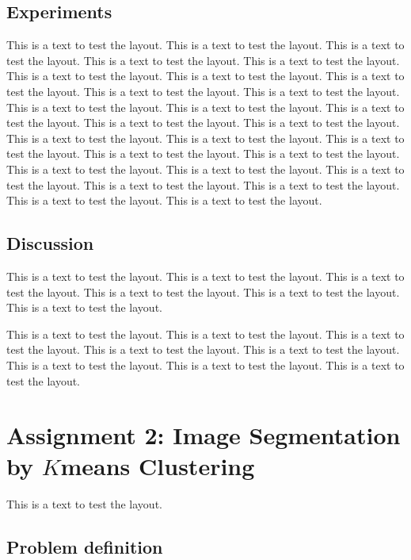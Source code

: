 \documentclass[a4paper,psfig,subfigure,epsfig,fleqn,ausarbeitung,amssmb,float,caption,fontenc]{article}
\begin{document}
\subsection{Experiments}

This is a text to test the layout. This is a text to test the layout.
This is a text to test the layout.  This is a text to test the layout.
This is a text to test the layout. This is a text to test the layout.
This is a text to test the layout. This is a text to test the layout.
This is a text to test the layout.  This is a text to test the layout.
This is a text to test the layout. This is a text to test the layout.
This is a text to test the layout. This is a text to test the layout.
This is a text to test the layout.  This is a text to test the layout.
This is a text to test the layout. This is a text to test the layout.
This is a text to test the layout. This is a text to test the layout.
This is a text to test the layout.  This is a text to test the layout.
This is a text to test the layout. This is a text to test the layout.
This is a text to test the layout. This is a text to test the layout.
This is a text to test the layout.

\subsection{Discussion}

This is a text to test the layout. This is a text to test the layout.
This is a text to test the layout.  This is a text to test the layout.
This is a text to test the layout. This is a text to test the layout.

This is a text to test the layout.  This is a text to test the layout.
This is a text to test the layout. This is a text to test the layout.
This is a text to test the layout. This is a text to test the layout.
This is a text to test the layout.  This is a text to test the layout.


\section{Assignment 2: Image Segmentation by \texorpdfstring{$K$}-means Clustering}
\label{sec:assignment2}

This is a text to test the layout.

\subsection{Problem definition}
\end{document}

